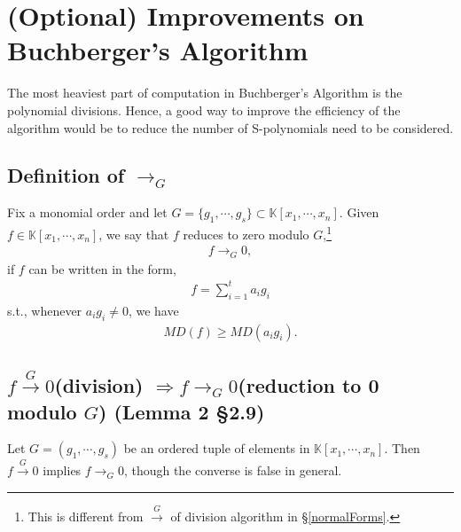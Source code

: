 \documentclass[11pt]{book}
\begin{document}
%

\section{(Optional) Improvements on Buchberger's Algorithm}
The most heaviest part of computation in Buchberger's Algorithm is the polynomial divisions.
Hence, a good way to improve the efficiency of the algorithm would be to reduce the number of S-polynomials need to be considered.

\subsection{Definition of $\to_G$}
Fix a monomial order and let $G = \{g_1, \cdots, g_s\} \subset \mathbb{K}[x_1, \cdots, x_n]$.
Given $f \in \mathbb{K}[x_1, \cdots, x_n]$, we say that $f$ reduces to zero modulo $G$,\footnote{This is different from $\stackrel{G}{\to}$ of division algorithm in \S\ref{normalForms}.}
\begin{eqnarray}
f \to_G 0,
\end{eqnarray}
if $f$ can be written in the form,
\begin{eqnarray}
f = \sum_{i=1}^t a_i g_i
\end{eqnarray}
s.t., whenever $a_i g_i \neq 0$, we have
\begin{eqnarray}
MD(f) \geq MD(a_i g_i).
\end{eqnarray}

\subsection{$f \stackrel{G}{\to} 0$(division) $\Rightarrow f \to_G 0$(reduction to 0 modulo $G$) (Lemma 2 \S2.9)}
\label{ModuloR0}
Let $G = (g_1, \cdots, g_s)$ be an ordered tuple of elements in $\mathbb{K}[x_1, \cdots, x_n]$.
Then $f \stackrel{G}{\to} 0$ implies $f \to_G 0$, though the converse is false in general.
\end{document}
